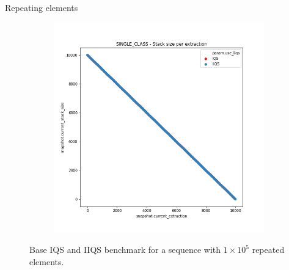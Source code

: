\documentclass{beamer}
\begin{document}
\begin{frame}{Repeating elements}
\begin{figure}
\begin{subfigure}[b]{\textwidth}
            \includegraphics[height=0.4\textheight]{chapter4/01-basebenchmark-04-single-class.png.2-0.png}
        \end{subfigure}
        \caption{Base IQS and IIQS benchmark for a sequence with $1\times10^5$ repeated elements.}
    \end{figure}
\end{frame}
\end{document}
